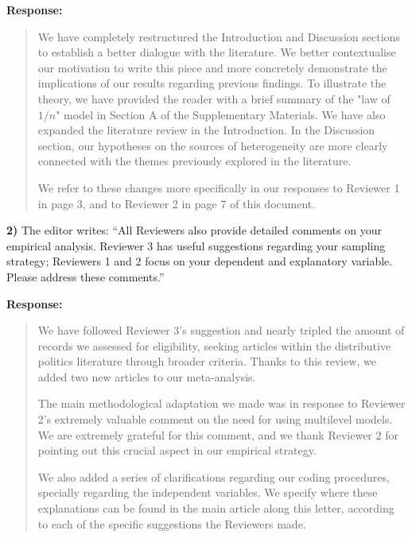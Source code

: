 \documentclass[a4paper,12pt]{article}
\begin{document}
\noindent \textbf{Response:} 
\begin{quote}
    We have completely restructured the Introduction and Discussion sections to establish a better dialogue with the literature. We better contextualise our motivation to write this piece and more concretely demonstrate the implications of our results regarding previous findings. To illustrate the theory, we have provided the reader with a brief summary of the "law of $1/n$" model in Section A of the Supplementary Materials. We have also expanded the literature review in the Introduction. In the Discussion section, our hypotheses on the sources of heterogeneity are more clearly connected with the themes previously explored in the literature.
    
    We refer to these changes more specifically in our responses to Reviewer 1 in page 3, and to Reviewer 2 in page 7 of this document.
\end{quote}

\vspace{.3cm}

\noindent \textbf{2)} The editor writes: ``All Reviewers also provide detailed comments on your empirical analysis. Reviewer 3 has useful suggestions regarding your sampling strategy; Reviewers 1 and 2 focus on your dependent and explanatory variable. Please address these comments.'' 

\vspace{.3cm}

\noindent \textbf{Response:} 
\begin{quote}
    We have followed Reviewer 3's suggestion and nearly tripled the amount of records we assessed for eligibility, seeking articles within the distributive politics literature through broader criteria. Thanks to this review, we added two new articles to our meta-analysis.
    
    The main methodological adaptation we made was in response to Reviewer 2's extremely valuable comment on the need for using multilevel models. We are extremely grateful for this comment, and we thank Reviewer 2 for pointing out this crucial aspect in our empirical strategy.
    
    We also added a series of clarifications regarding our coding procedures, specially regarding the independent variables. We specify where these explanations can be found in the main article along this letter, according to each of the specific suggestions the Reviewers made.
\end{quote}
\end{document}
